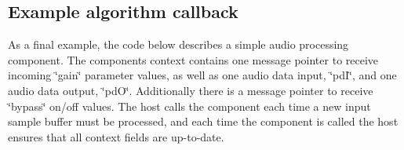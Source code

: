  \hypertarget{a00327_alg_examp}{}\subsection{Example algorithm callback}\label{a00327_alg_examp}
 As a final example, the code below describes a simple audio processing component. The component\textquotesingle{}s context contains one message pointer to receive incoming \char`\"{}gain\char`\"{} parameter values, as well as one audio data input, \char`\"{}pd\+I\char`\"{}, and one audio data output, \char`\"{}pd\+O\char`\"{}. Additionally there is a message pointer to receive \char`\"{}bypass\char`\"{} on/off values. The host calls the component each time a new input sample buffer must be processed, and each time the component is called the host ensures that all context fields are up-\/to-\/date.


